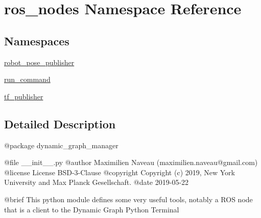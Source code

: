 \hypertarget{namespaceros__nodes}{}\section{ros\+\_\+nodes Namespace Reference}
\label{namespaceros__nodes}
\subsection*{Namespaces}
\begin{DoxyCompactItemize}
\item 
 \hyperlink{namespaceros__nodes_1_1robot__pose__publisher}{robot\+\_\+pose\+\_\+publisher}
\item 
 \hyperlink{namespaceros__nodes_1_1run__command}{run\+\_\+command}
\item 
 \hyperlink{namespaceros__nodes_1_1tf__publisher}{tf\+\_\+publisher}
\end{DoxyCompactItemize}


\subsection{Detailed Description}
\begin{DoxyVerb}@package dynamic_graph_manager

@file __init__.py
@author Maximilien Naveau (maximilien.naveau@gmail.com)
@license License BSD-3-Clause
@copyright Copyright (c) 2019, New York University and Max Planck Gesellschaft.
@date 2019-05-22

@brief This python module defines some very useful tools, notably a ROS node
that is a client to the Dynamic Graph Python Terminal\end{DoxyVerb}
 